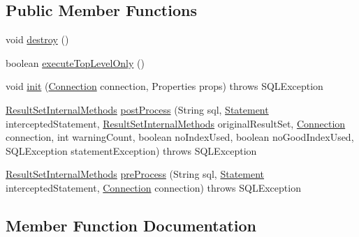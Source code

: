 \subsection*{Public Member Functions}
\begin{DoxyCompactItemize}
\item 
void \mbox{\hyperlink{classcom_1_1mysql_1_1jdbc_1_1_load_balanced_auto_commit_interceptor_aca69669db95231d8c2fff5800b62c7f7}{destroy}} ()
\item 
boolean \mbox{\hyperlink{classcom_1_1mysql_1_1jdbc_1_1_load_balanced_auto_commit_interceptor_afdb08603f13610a4d26d188bf171c232}{execute\+Top\+Level\+Only}} ()
\item 
void \mbox{\hyperlink{classcom_1_1mysql_1_1jdbc_1_1_load_balanced_auto_commit_interceptor_a7ac3a68deb0ddbc6ede5ece0824d3189}{init}} (\mbox{\hyperlink{interfacecom_1_1mysql_1_1jdbc_1_1_connection}{Connection}} connection, Properties props)  throws S\+Q\+L\+Exception 
\item 
\mbox{\hyperlink{interfacecom_1_1mysql_1_1jdbc_1_1_result_set_internal_methods}{Result\+Set\+Internal\+Methods}} \mbox{\hyperlink{classcom_1_1mysql_1_1jdbc_1_1_load_balanced_auto_commit_interceptor_a54b925109880e6e84eb16b36f608ecd3}{post\+Process}} (String sql, \mbox{\hyperlink{interfacecom_1_1mysql_1_1jdbc_1_1_statement}{Statement}} intercepted\+Statement, \mbox{\hyperlink{interfacecom_1_1mysql_1_1jdbc_1_1_result_set_internal_methods}{Result\+Set\+Internal\+Methods}} original\+Result\+Set, \mbox{\hyperlink{interfacecom_1_1mysql_1_1jdbc_1_1_connection}{Connection}} connection, int warning\+Count, boolean no\+Index\+Used, boolean no\+Good\+Index\+Used, S\+Q\+L\+Exception statement\+Exception)  throws S\+Q\+L\+Exception 
\item 
\mbox{\hyperlink{interfacecom_1_1mysql_1_1jdbc_1_1_result_set_internal_methods}{Result\+Set\+Internal\+Methods}} \mbox{\hyperlink{classcom_1_1mysql_1_1jdbc_1_1_load_balanced_auto_commit_interceptor_a6a69c6841856a5f6f8062206f2854d76}{pre\+Process}} (String sql, \mbox{\hyperlink{interfacecom_1_1mysql_1_1jdbc_1_1_statement}{Statement}} intercepted\+Statement, \mbox{\hyperlink{interfacecom_1_1mysql_1_1jdbc_1_1_connection}{Connection}} connection)  throws S\+Q\+L\+Exception 
\end{DoxyCompactItemize}


\subsection{Member Function Documentation}
\mbox{\label{classcom_1_1mysql_1_1jdbc_1_1_load_balanced_auto_commit_interceptor_aca69669db95231d8c2fff5800b62c7f7}} 

